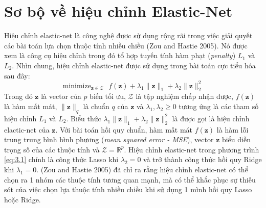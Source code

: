 \section{Sơ bộ về hiệu chỉnh Elastic-Net}
Hiệu chỉnh elastic-net là công nghệ được sử dụng rộng rãi trong việc giải quyết 
các bài toán lựa chọn thuộc tính nhiều chiều (Zou and Hastie 2005). Nó được xem 
là công cụ hiệu chỉnh trong đó tổ hợp tuyến tính hàm phạt (\textit{penalty})
$L_1$ và $L_2$. Nhìn chung, hiệu chỉnh elastic-net được sử dụng trong bài toán cực 
tiểu hóa sau đây:
\begin{equation}
    \label{eq:3.1}
    \text{minimize}_{\mathbf{z} \in \mathcal{Z}} \text{ }
    f(\mathbf{z}) + \lambda_1 \lVert \mathbf{z} \rVert_1
    + \lambda_2 \lVert \mathbf{z} \rVert_2^2
\end{equation}
Trong đó $\mathbf{z}$ là vector của $p$ biến tối ưu, $\mathcal{Z}$ là tập nghiệm 
chấp nhận được, $f(\mathbf{z})$ là hàm mất mát, $\lVert \mathbf{z} \rVert_q$ là 
chuẩn $q$ của $\mathbf{z}$ và $\lambda_1, \lambda_2 \geq 0$ tương ứng là các tham số hiệu 
chỉnh $L_1$ và $L_2$. Biểu thức $\lambda_1 \lVert \mathbf{z} \rVert_1 + \lambda_2 
\lVert \mathbf{z} \rVert_2^2$ là được gọi là hiệu chỉnh elactic-net của $\mathbf{z}$.
Với bài toán hồi quy chuẩn, hàm mất mát $f(\mathbf{z})$ là hàm lỗi trung trung bình
bình phương (\textit{mean squared error - MSE}), vector $\mathbf{z}$ biểu diễn trọng 
số của các thuộc tính và $\mathcal{Z} = \mathbb{R}^p$. Hiệu chỉnh elastic-net trong 
phương trình \ref{eq:3.1} chính là công thức Lasso khi $\lambda_2 = 0$ và trở thành công 
thức hồi quy Ridge khi $\lambda_1 = 0$. (Zou and Hastie 2005) đã chỉ ra rằng hiệu chỉnh 
elastic-net có thể chọn ra 1 nhóm các thuộc tính tương quan mạnh, mà có thể khắc phục sự 
thiếu sót của việc chọn lựa thuộc tính nhiều chiều khi sử dụng 1 mình hồi quy Lasso 
hoặc Ridge.
